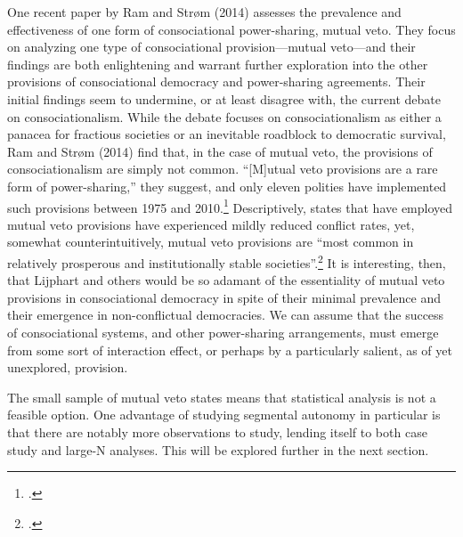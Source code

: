 \documentclass[12pt]{article}
\begin{document}
One recent paper by Ram and Strøm (2014) assesses the prevalence and effectiveness of one form of consociational power-sharing, mutual veto. They focus on analyzing one type of consociational provision---mutual veto---and their findings are both enlightening and warrant further exploration into the other provisions of consociational democracy and power-sharing agreements. Their initial findings seem to undermine, or at least disagree with, the current debate on consociationalism. While the debate focuses on consociationalism as either a panacea for fractious societies or an inevitable roadblock to democratic survival, Ram and Strøm (2014) find that, in the case of mutual veto, the provisions of consociationalism are simply not common. ``[M]utual veto provisions are a rare form of power-sharing,'' they suggest, and only eleven polities have implemented such provisions between 1975 and 2010.\footcite[345]{ram_mutual_2014} Descriptively, states that have employed mutual veto provisions have experienced mildly reduced conflict rates, yet, somewhat counterintuitively, mutual veto provisions are ``most common in relatively prosperous and institutionally stable societies''.\footcite[355]{ram_mutual_2014} It is interesting, then, that Lijphart and others would be so adamant of the essentiality of mutual veto provisions in consociational democracy in spite of their minimal prevalence and their emergence in non-conflictual democracies. We can assume that the success of consociational systems, and other power-sharing arrangements, must emerge from some sort of interaction effect, or perhaps by a particularly salient, as of yet unexplored, provision.

The small sample of mutual veto states means that statistical analysis is not a feasible option. One advantage of studying segmental autonomy in particular is that there are notably more observations to study, lending itself to both case study and large-N analyses. This will be explored further in the next section.  
\end{document}
